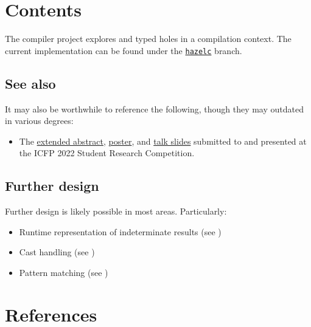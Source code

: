 \documentclass{report}
\begin{document}
\setcounter{chapter}{13}

\section{Contents}
The compiler project explores \Hazel{} and typed holes in a compilation context. The
current implementation can be found under the
\href{https://github.com/hazelgrove/hazel/tree/hazelc}{\texttt{hazelc}} branch. 

\tableofcontents

\subsection{See also}
\label{sec:see-also}
It may also be worthwhile to reference the following, though they may outdated in various degrees:
%
\begin{itemize}
  \item The \href{https://github.com/hazelgrove/hazelc-icfp22-src}{extended abstract},
    \href{https://github.com/mirryi/hazelc-icfp22-poster}{poster}, and
    \href{https://github.com/mirryi/hazelc-icfp22-slides}{talk slides} submitted to and presented at
    the ICFP 2022 Student Research Competition.
\end{itemize}

\subsection{Further design}
\label{sec:further-design}
Further design is likely possible in most areas. Particularly:
\begin{itemize}
  \item Runtime representation of indeterminate results (see )
  \item Cast handling (see )
  \item Pattern matching (see )
\end{itemize}






\section{References}
\printbibliography[heading=none]
\end{document}
